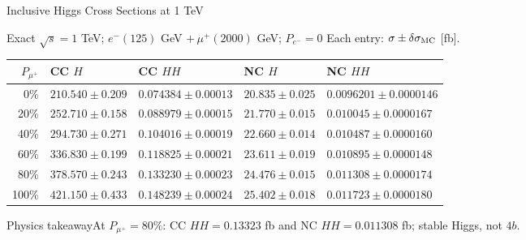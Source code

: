 \documentclass[aspectratio=1610,english]{beamer}
\newcommand{\src}[1]{\vfill{\par\color{black!65}\fontsize{6.4}{7.4}\selectfont\emph{Source:} #1\par}}
\newcommand{\key}[1]{\begin{alertblock}{Physics takeaway}\small  #1\end{alertblock}}
\begin{document}
\begin{frame}[t]{Inclusive Higgs Cross Sections at 1 TeV}
\scriptsize

\begin{block}{Exact $\sqrt{s}=1$ TeV; $e^-(125)$ GeV $+\,\mu^+(2000)$ GeV; $P_{e^-}=0$}
\scriptsize\centering Each entry: $\sigma\pm\delta\sigma_{\rm MC}$ [fb].\\[-.6em]
\begin{center}\setlength{\tabcolsep}{3pt}\renewcommand{\arraystretch}{1.23}\begin{tabular}{rllll}\toprule $P_{\mu^+}$ & CC $H$ & CC $HH$ & NC $H$ & NC $HH$ \\ \midrule
0\% & $210.540\pm0.209$ & $0.074384\pm0.00013$ & $20.835\pm0.025$ & $0.0096201\pm0.0000146$ \\
20\% & $252.710\pm0.158$ & $0.088979\pm0.00015$ & $21.770\pm0.015$ & $0.010045\pm0.0000167$ \\
40\% & $294.730\pm0.271$ & $0.104016\pm0.00019$ & $22.660\pm0.014$ & $0.010487\pm0.0000160$ \\
60\% & $336.830\pm0.199$ & $0.118825\pm0.00021$ & $23.611\pm0.019$ & $0.010895\pm0.0000148$ \\
80\% & $378.570\pm0.243$ & $0.133230\pm0.00023$ & $24.476\pm0.015$ & $0.011308\pm0.0000174$ \\
100\% & $421.150\pm0.433$ & $0.148239\pm0.00024$ & $25.402\pm0.018$ & $0.011723\pm0.0000180$ \\
\bottomrule\end{tabular}\end{center}
\end{block}
\key{At $P_{\mu^+}=80\%$: CC $HH=0.13323$ fb and NC $HH=0.011308$ fb; stable Higgs, not $4b$.}

\end{frame}
\end{document}

